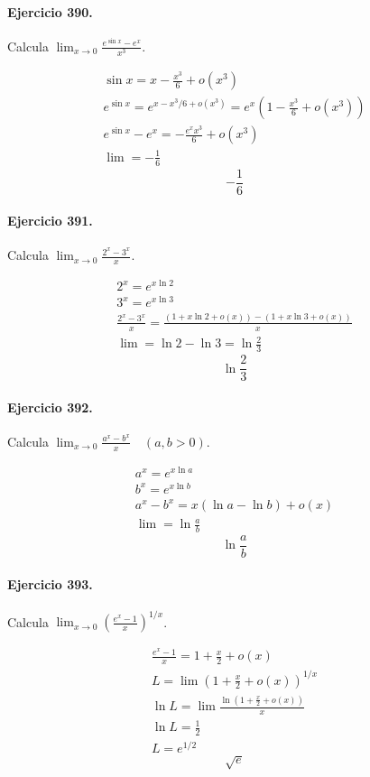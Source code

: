 \documentclass[11pt,a4paper]{article}
\begin{document}
\paragraph{Ejercicio 390.} Calcula $\displaystyle \lim_{x\to0}\frac{e^{\sin x}-e^x}{x^3}$.

\[
\begin{aligned}
\sin x=x-\frac{x^3}{6}+o(x^3)\\
e^{\sin x}=e^{x-x^3/6+o(x^3)}=e^x\left(1-\frac{x^3}{6}+o(x^3)\right)\\
e^{\sin x}-e^x=-\frac{e^xx^3}{6}+o(x^3)\\
\lim=-\frac16
\end{aligned}
\]
\[\boxed{-\frac16}\]


\paragraph{Ejercicio 391.} Calcula $\displaystyle \lim_{x\to0}\frac{2^x-3^x}{x}$.

\[
\begin{aligned}
2^x=e^{x\ln2}\\
3^x=e^{x\ln3}\\
\frac{2^x-3^x}{x}=\frac{(1+x\ln2+o(x))-(1+x\ln3+o(x))}{x}\\
\lim=\ln2-\ln3=\ln\frac23
\end{aligned}
\]
\[\boxed{\ln\frac23}\]


\paragraph{Ejercicio 392.} Calcula $\displaystyle \lim_{x\to0}\frac{a^x-b^x}{x}\quad(a,b>0)$.

\[
\begin{aligned}
a^x=e^{x\ln a}\\
b^x=e^{x\ln b}\\
a^x-b^x=x(\ln a-\ln b)+o(x)\\
\lim=\ln\frac{a}{b}
\end{aligned}
\]
\[\boxed{\ln\frac{a}{b}}\]


\paragraph{Ejercicio 393.} Calcula $\displaystyle \lim_{x\to0}\left(\frac{e^x-1}{x}\right)^{1/x}$.

\[
\begin{aligned}
\frac{e^x-1}{x}=1+\frac{x}{2}+o(x)\\
L=\lim\left(1+\frac{x}{2}+o(x)\right)^{1/x}\\
\ln L=\lim\frac{\ln(1+\frac{x}{2}+o(x))}{x}\\
\ln L=\frac12\\
L=e^{1/2}
\end{aligned}
\]
\[\boxed{\sqrt e}\]
\end{document}
